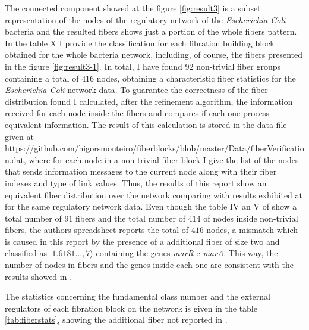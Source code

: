 \documentclass[12pt]{diazessay} %
\begin{document}
The connected component showed at the figure \ref{fig:result3} is a subset representation of the nodes of the regulatory network of the \textit{Escherichia Coli} bacteria and the resulted fibers shows just a portion of the whole fibers pattern. In the table X I provide the classification for each fibration building block obtained for the whole bacteria network, including, of course, the fibers presented in the figure \ref{fig:result3-1}. In total, I have found $92$ non-trivial fiber groups containing a total of $416$ nodes, obtaining a characteristic fiber statistics for the \textit{Escherichia Coli} network data. To guarantee the correctness of the fiber distribution found I calculated, after the refinement algorithm, the information received for each node inside the fibers and compares if each one process equivalent information. The result of this calculation is stored in the data file given at \url{https://github.com/higorsmonteiro/fiberblocks/blob/master/Data/fiberVerification.dat}, where for each node in a non-trivial fiber block I give the list of the nodes that sends information messages to the current node along with their fiber indexes and type of link values. Thus, the results of this report show an equivalent fiber distribution over the network comparing with results exhibited at \cite{fibration2019} for the same regulatory network data. Even though the table IV an V of \cite{fibration2019} show a total number of $91$ fibers and the total number of $414$ of nodes inside non-trivial fibers, the authors \href{https://docs.google.com/spreadsheets/d/1-RG5vR_EGNPqQcnJU8q3ky1OpWi3OjTh5Uo-Xa0PjOc/edit#gid=1973910256}{spreadsheet} reports the total of $416$ nodes, a mismatch which is caused in this report by the presence of a additional fiber of size two and classified as $| 1.6181..., 7 \rangle$ containing the genes \textit{marR} e \textit{marA}. This way, the number of nodes in fibers and the genes inside each one are consistent with the results showed in \cite{fibration2019}.

The statistics concerning the fundamental class number and the external regulators of each fibration block on the network is given in the table \ref{tab:fiberstats}, showing the additional fiber not reported in \cite{fibration2019}. 
\end{document}
